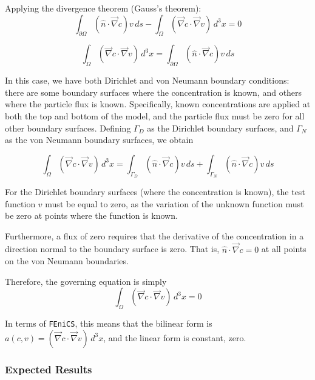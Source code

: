 \documentclass{article}
\begin{document}
Applying the divergence theorem (Gauss's theorem):
\begin{equation}
\int_{\partial\Omega} \left( \hat{n} \cdot \vec{\nabla} c \right) v\,ds
- \int_{\Omega} \left( \vec{\nabla}c \cdot \vec{\nabla}v \right) \,d^3x = 0
\end{equation}

\begin{equation}
\int_{\Omega} \left( \vec{\nabla}c \cdot \vec{\nabla}v \right) \,d^3x =
\int_{\partial\Omega} \left( \hat{n} \cdot \vec{\nabla} c \right) v\,ds
\end{equation}

In this case, we have both Dirichlet and von Neumann boundary conditions:
there are some boundary surfaces where the concentration is known,
and others where the particle flux is known.
Specifically, known concentrations are applied at both the top and bottom of the model,
and the particle flux must be zero for all other boundary surfaces.
Defining $\Gamma_D$ as the Dirichlet boundary surfaces,
and $\Gamma_N$ as the von Neumann boundary surfaces, we obtain

\begin{equation}
\int_{\Omega} \left( \vec{\nabla}c \cdot \vec{\nabla}v \right) \,d^3x =
\int_{\Gamma_D} \left( \hat{n} \cdot \vec{\nabla} c \right) v\,ds
+\int_{\Gamma_N} \left( \hat{n} \cdot \vec{\nabla} c \right) v\,ds
\end{equation}

For the Dirichlet boundary surfaces (where the concentration is known),
the test function $v$ must be equal to zero,
as the variation of the unknown function must be zero at points where the function is known.

Furthermore, a flux of zero requires that the derivative of the concentration in a direction
normal to the boundary surface is zero.
That is, $\hat{n} \cdot \vec{\nabla} c = 0$ at all points on the von Neumann boundaries.

Therefore, the governing equation is simply
\begin{equation}
\int_{\Omega} \left( \vec{\nabla}c \cdot \vec{\nabla}v \right) \,d^3x = 0
\end{equation}

In terms of \texttt{FEniCS}, this means that the bilinear form is
$a(c,v)=\left( \vec{\nabla}c \cdot \vec{\nabla}v \right) \,d^3x$,
and the linear form is constant, zero.

\subsubsection{Expected Results}\label{subsubsec:unhom_fick_expected}
\end{document}
